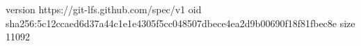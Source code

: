 version https://git-lfs.github.com/spec/v1
oid sha256:5c12ccaed6d37a44c1e1e4305f5cc048507dbece4ea2d9b00690f18f81fbec8e
size 11092
